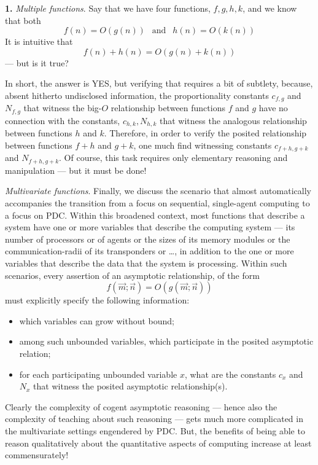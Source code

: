 \noindent
{\bf 1.}
{\em Multiple functions}.
%
Say that we have four functions, $f, g, h, k$, and we know that both
\[ f(n) = O(g(n)) \ \ \mbox{ and } \ \ h(n) = O(k(n)) \]
It is intuitive that
\[ f(n) + h(n) = O(g(n) + k(n)) \]
--- but is it true?

In short, the answer is YES, but verifying that requires a bit of
subtlety, because, absent hitherto undisclosed information, the
proportionality constants $c_{f,g}$ and $N_{f,g}$ that witness the
big-$O$ relationship between functions $f$ and $g$ have no connection
with the constants, $c_{h,k}, N_{h,k}$ that witness the analogous
relationship between functions $h$ and $k$.  Therefore, in order to
verify the posited relationship between functions $f + h$ and $g + k$,
one much find witnessing constants $c_{f+h, g+k}$ and $N_{f+h,g+k}$.
Of course, this task requires only elementary reasoning and
manipulation --- but it must be done!


{\em Multivariate functions}.
%
Finally, we discuss the scenario that almost automatically accompanies
the transition from a focus on sequential, single-agent computing to a
focus on PDC.  Within this broadened context, most functions that
describe a system have one or more variables that describe the
computing system --- its number of processors or of agents or the
sizes of its memory modules or the communication-radii of its
transponders or \ldots, in addition to the one or more variables that
describe the data that the system is processing.  Within such
scenarios, every assertion of an asymptotic relationship, of the form
\[ f(\vec{m}; \vec{n}) = O(g(\vec{m}; \vec{n})) \]
must explicitly specify the following information:
\begin{itemize}
\item
which variables can grow without bound;
\item
among such unbounded variables, which participate in the posited
asymptotic relation;
\item
for each participating unbounded variable $x$, what are the constants
$c_x$ and $N_x$ that witness the posited asymptotic relationship(s).
\end{itemize}

Clearly the complexity of cogent asymptotic reasoning --- hence also
the complexity of teaching about such reasoning --- gets much more
complicated in the multivariate settings engendered by PDC.  But, the
benefits of being able to reason qualitatively about the quantitative
aspects of computing increase at least commensurately!

